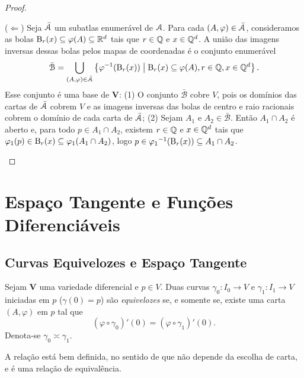 \begin{proof}
\begin{enumerate}
($\Leftarrow$) Seja $\bar {\mathcal{A}}$ um subatlas enumerável de $\mathcal{A}$. Para cada $(A,\varphi) \in \bar {\mathcal{A}}$, consideramos as bolas $\mathrm{B}_r(x) \subseteq \varphi(A) \subseteq \mathbb{R}^d$ tais que $r \in \mathbb{Q}$ e $x \in \mathbb{Q}^d$. A união das imagens inversas dessas bolas pelos mapas de coordenadas é o conjunto enumerável
	\begin{equation*}
	\bar{\mathcal B} = \bigcup_{(A,\varphi) \in \bar {\mathcal{A}}} \left\{\varphi^{-1}(\mathrm{B}_r(x)) \;\middle\vert\; \mathrm{B}_r(x) \subseteq \varphi(A),  r \in \mathbb{Q}, x \in \mathbb{Q}^d \right\}.
	\end{equation*}
Esse conjunto é uma base de $\bm V$: (1) O conjunto $\bar{\mathcal B}$ cobre $V$, pois os domínios das cartas de $\bar{\mathcal{A}}$ cobrem $V$ e as imagens inversas das bolas de centro e raio racionais cobrem o domínio de cada carta de $\bar{\mathcal{A}}$; (2) Sejam $A_1$ e $A_2 \in \bar{\mathcal B}$. Então $A_1 \cap A_2$ é aberto e, para todo $p \in A_1 \cap A_2$, existem $r \in \mathbb{Q}$ e $x \in \mathbb{Q}^d$ tais que $\varphi_1(p) \in \mathrm{B}_{r}(x) \subseteq \varphi_1(A_1 \cap A_2)$, logo $p \in {\varphi_1}^{-1}(\mathrm{B}_r(x)) \subseteq A_1 \cap A_2$.
		\end{enumerate}
\end{proof}

\section{Espaço Tangente e Funções Diferenciáveis}

\subsection{Curvas Equivelozes e Espaço Tangente}

\begin{defi}
Sejam $\bm V$ uma variedade diferencial e $p \in V$. Duas curvas $\gamma_0: I_0 \to V$ e $\gamma_1: I_1 \to V$ iniciadas em $p$ ($\gamma(0)=p$) são \emph{equivelozes} se, e somente se, existe uma carta $(A,\varphi)$ em $p$ tal que
	\begin{equation*}
	(\varphi \circ \gamma_0)'(0) = (\varphi \circ \gamma_1)'(0).
	\end{equation*}
Denota-se $\gamma_0 \asymp \gamma_1$.
\end{defi}

A relação está bem definida, no sentido de que não depende da escolha de carta, e é uma relação de equivalência.

